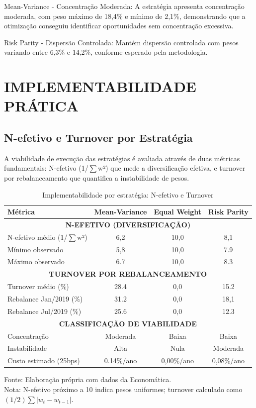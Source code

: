 Mean-Variance - Concentração Moderada: A estratégia apresenta concentração moderada, com peso máximo de 18,4\% e mínimo de 2,1\%, demonstrando que a otimização conseguiu identificar oportunidades sem concentração excessiva.

Risk Parity - Dispersão Controlada: Mantém dispersão controlada com pesos variando entre 6,3\% e 14,2\%, conforme esperado pela metodologia.

\section{IMPLEMENTABILIDADE PRÁTICA}

\subsection{N-efetivo e Turnover por Estratégia}

A viabilidade de execução das estratégias é avaliada através de duas métricas fundamentais: N-efetivo (1/$\sum$w²) que mede a diversificação efetiva, e turnover por rebalanceamento que quantifica a instabilidade de pesos.

\begin{table}[H]
\centering
\caption{Implementabilidade por estratégia: N-efetivo e Turnover}
\label{tab:implementabilidade}
\begin{tabular}{|l|c|c|c|}
\hline
\textbf{Métrica} & \textbf{Mean-Variance} & \textbf{Equal Weight} & \textbf{Risk Parity} \\
\hline
\multicolumn{4}{|c|}{\textbf{N-EFETIVO (DIVERSIFICAÇÃO)}} \\
\hline
N-efetivo médio (1/$\sum$w²) & 6,2 & 10,0 & 8,1 \\
Mínimo observado & 5,8 & 10,0 & 7.9 \\
Máximo observado & 6.7 & 10,0 & 8.3 \\
\hline
\multicolumn{4}{|c|}{\textbf{TURNOVER POR REBALANCEAMENTO}} \\
\hline
Turnover médio (\%) & 28.4 & 0,0 & 15.2 \\
Rebalance Jan/2019 (\%) & 31.2 & 0,0 & 18,1 \\
Rebalance Jul/2019 (\%) & 25.6 & 0,0 & 12.3 \\
\hline
\multicolumn{4}{|c|}{\textbf{CLASSIFICAÇÃO DE VIABILIDADE}} \\
\hline
Concentração & Moderada & Baixa & Baixa \\
Instabilidade & Alta & Nula & Moderada \\
Custo estimado (25bps) & 0.14\%/ano & 0,00\%/ano & 0,08\%/ano \\
\hline
\end{tabular}
\footnotesize
Fonte: Elaboração própria com dados da Economática.\\
Nota: N-efetivo próximo a 10 indica pesos uniformes; turnover calculado como $(1/2)\sum|w_{t}-w_{t-1}|$.
\end{table}

